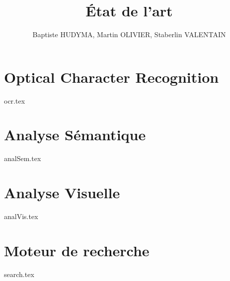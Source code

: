 \documentclass[a4paper, 12pt, titlepage, oneside, french]{article}
\author{Baptiste HUDYMA, Martin OLIVIER, Staberlin VALENTAIN}
\title{État de l'art}
\begin{document}
\maketitle

\tableofcontents


\newpage
\section{Optical Character Recognition}
{ocr.tex}
\newpage

\section{Analyse Sémantique}
{analSem.tex}
\newpage

\section{Analyse Visuelle}
{analVis.tex}
\newpage

\section{Moteur de recherche}
{search.tex}
\newpage
\end{document}
